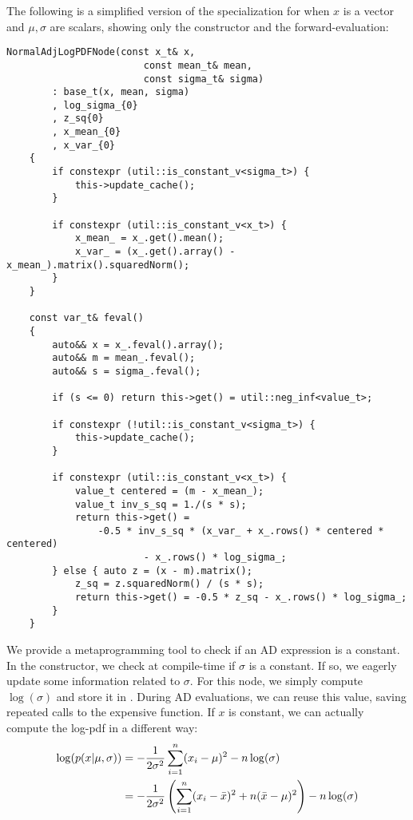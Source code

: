 The following is a simplified version of the specialization 
for when $x$ is a vector and $\mu, \sigma$ are scalars, 
showing only the constructor and the forward-evaluation:
\begin{lstlisting}[style=customcpp]
    NormalAdjLogPDFNode(const x_t& x,
                        const mean_t& mean,
                        const sigma_t& sigma)
        : base_t(x, mean, sigma)
        , log_sigma_{0}
        , z_sq{0}
        , x_mean_{0}
        , x_var_{0}
    {
        if constexpr (util::is_constant_v<sigma_t>) {
            this->update_cache();
        }

        if constexpr (util::is_constant_v<x_t>) {
            x_mean_ = x_.get().mean();
            x_var_ = (x_.get().array() - x_mean_).matrix().squaredNorm();
        }
    }

    const var_t& feval()
    {
        auto&& x = x_.feval().array();
        auto&& m = mean_.feval();
        auto&& s = sigma_.feval();

        if (s <= 0) return this->get() = util::neg_inf<value_t>;

        if constexpr (!util::is_constant_v<sigma_t>) {
            this->update_cache();
        }

        if constexpr (util::is_constant_v<x_t>) {
            value_t centered = (m - x_mean_);
            value_t inv_s_sq = 1./(s * s);
            return this->get() = 
                -0.5 * inv_s_sq * (x_var_ + x_.rows() * centered * centered) 
                        - x_.rows() * log_sigma_;
        } else { auto z = (x - m).matrix();
            z_sq = z.squaredNorm() / (s * s);
            return this->get() = -0.5 * z_sq - x_.rows() * log_sigma_; 
        }
    }
\end{lstlisting}
We provide a metaprogramming tool to check if an AD expression is a constant.
In the constructor, we check at compile-time if $\sigma$ is a constant.
If so, we eagerly update some information related to $\sigma$.
For this node, we simply compute $\log(\sigma)$ and store it in .
During AD evaluations, we can reuse this value, saving repeated calls to the expensive  function.
If $x$ is constant, we can actually compute the log-pdf in a different way:
\begin{align}
    \log(p(x|\mu, \sigma)) 
    &= -\frac{1}{2 \sigma^2} 
        \sum\limits_{i=1}^n (x_i - \mu)^2 
        - n\log(\sigma) \label{eq:normal_log_pdf} \\
    &= -\frac{1}{2 \sigma^2} 
        \left(\sum\limits_{i=1}^n (x_i - \bar{x})^2 + n(\bar{x} - \mu)^2\right) 
        - n\log(\sigma) \label{eq:normal_log_pdf_x_const}
\end{align}
